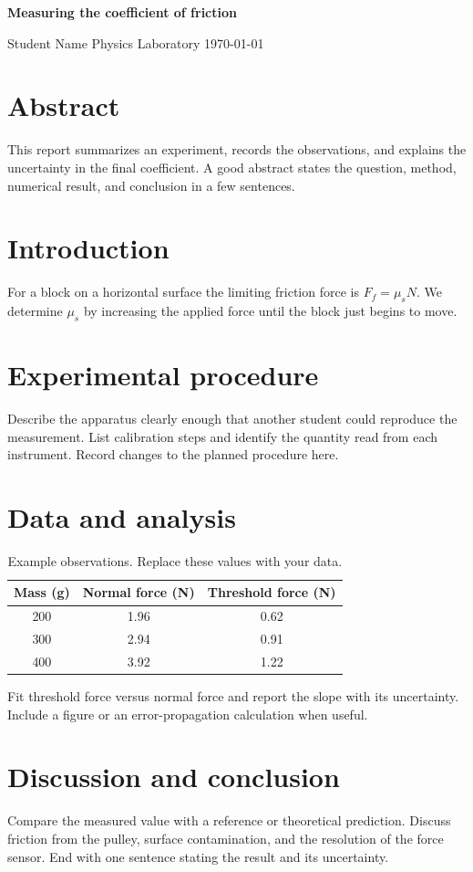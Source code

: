 \documentclass[11pt]{article}
\begin{document}
\begin{center}
{\Large\bfseries Measuring the coefficient of friction}\par\medskip
{\large Student Name \quad Physics Laboratory \quad \today}
\end{center}
\section*{Abstract}
This report summarizes an experiment, records the observations, and explains
the uncertainty in the final coefficient. A good abstract states the question,
method, numerical result, and conclusion in a few sentences.
\section{Introduction}
For a block on a horizontal surface the limiting friction force is
\(F_f=\mu_s N\). We determine \(\mu_s\) by increasing the applied force until
the block just begins to move.
\section{Experimental procedure}
Describe the apparatus clearly enough that another student could reproduce the
measurement. List calibration steps and identify the quantity read from each
instrument. Record changes to the planned procedure here.
\section{Data and analysis}
\begin{table}[h]
\centering
\caption{Example observations. Replace these values with your data.}
\begin{tabular}{ccc}
\toprule
Mass (g) & Normal force (N) & Threshold force (N)\\
\midrule
200 & 1.96 & 0.62\\
300 & 2.94 & 0.91\\
400 & 3.92 & 1.22\\
\bottomrule
\end{tabular}
\end{table}
Fit threshold force versus normal force and report the slope with its
uncertainty. Include a figure or an error-propagation calculation when useful.
\section{Discussion and conclusion}
Compare the measured value with a reference or theoretical prediction. Discuss
friction from the pulley, surface contamination, and the resolution of the
force sensor. End with one sentence stating the result and its uncertainty.
\end{document}
